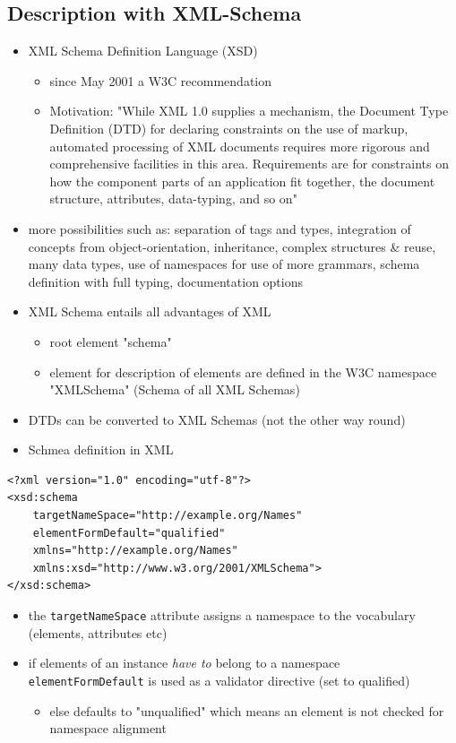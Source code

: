 \documentclass[11pt]{article}
\begin{document}
\subsection{Description with XML-Schema}
\label{sec:orga32848f}
\begin{itemize}
\item XML Schema Definition Language (XSD)
\begin{itemize}
\item since May 2001 a W3C recommendation
\item Motivation: "While XML 1.0 supplies a mechanism, the Document Type Definition (DTD) for declaring constraints on the use of markup, automated processing of XML documents requires more rigorous and comprehensive facilities in this area. Requirements are for constraints on how the component parts of an application fit together, the document structure, attributes, data-typing, and so on"
\end{itemize}
\item more possibilities such as: separation of tags and types, integration of concepts from object-orientation, inheritance, complex structures \& reuse, many data types, use of namespaces for use of more grammars, schema definition with full typing, documentation options
\item XML Schema entails all advantages of XML
\begin{itemize}
\item root element "schema"
\item element for description of elements are defined in the W3C namespace "XMLSchema" (Schema of all XML Schemas)
\end{itemize}
\item DTDs can be converted to XML Schemas (not the other way round)
\item Schmea definition in XML
\end{itemize}
\lstset{breaklines=true,language=XML,label= ,caption= ,captionpos=b,numbers=none}
\begin{lstlisting}
<?xml version="1.0" encoding="utf-8"?>
<xsd:schema
    targetNameSpace="http://example.org/Names"
    elementFormDefault="qualified"
    xmlns="http://example.org/Names"
    xmlns:xsd="http://www.w3.org/2001/XMLSchema">
</xsd:schema>
\end{lstlisting}
\begin{itemize}
\item the \texttt{targetNameSpace} attribute assigns a namespace to the vocabulary (elements, attributes etc)
\item if elements of an instance \emph{have to} belong to a namespace \texttt{elementFormDefault} is used as a validator directive (set to qualified)
\begin{itemize}
\item else defaults to "unqualified" which means an element is not checked for namespace alignment
\end{itemize}
\end{itemize}
\end{document}
